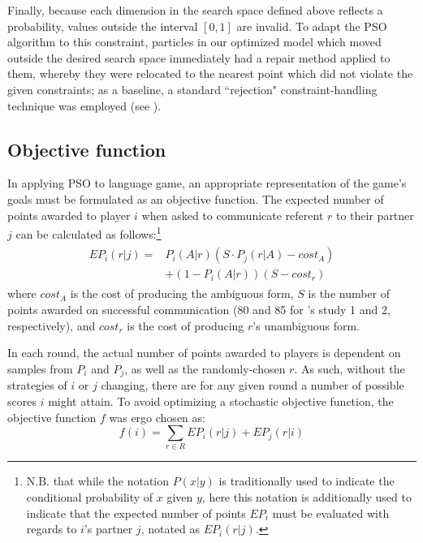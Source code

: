 \documentclass[a4paper,11pt]{article}
\begin{document}
Finally, because each dimension in the search space defined above reflects a probability, values outside the interval $[0, 1]$ are invalid. To adapt the PSO algorithm to this constraint, particles in our optimized model which moved outside the desired search space immediately had a repair method applied to them, whereby they were relocated to the nearest point which did not violate the given constraints; as a baseline, a standard ``rejection" constraint-handling technique was employed (see ).
 
\subsection{Objective function}
\label{sec:objective_func}
In applying PSO to \citeauthor{rohde2012} language game, an appropriate representation of the game's goals must be formulated as an objective function. The expected number of points awarded to player $i$ when asked to communicate referent $r$ to their partner $j$ can be calculated as follows:\footnote{N.B. that while the notation $P(x|y)$ is traditionally used to indicate the conditional probability of $x$ given $y$, here this notation is additionally used to indicate that the expected number of points $EP_i$ must be evaluated with regards to $i$'s partner $j$, notated as $EP_{i}(r|j)$.}
\begin{multline}
\begin{split}
EP_{i}(r|j) = & P_i(A|r)(S \cdot P_j(r|A) - cost_A) \\
              & + (1 - P_i(A|r))(S - cost_r) 
\end{split}
\end{multline}
where $cost_A$ is the cost of producing the ambiguous form, $S$ is the number of points awarded on successful communication (80 and 85 for \citeauthor{rohde2012}'s study 1 and 2, respectively), and $cost_r$ is the cost of producing $r$'s unambiguous form.

In each round, the actual number of points awarded to players is dependent on samples from $P_i$ and $P_j$, as well as the randomly-chosen $r$. As such, without the strategies of $i$ or $j$ changing, there are for any given round a number of possible scores $i$ might attain. To avoid optimizing a stochastic objective function, the objective function $f$ was ergo chosen as:
\begin{equation}
f(i) = \sum_{r \in R} EP_{i}(r|j) + EP_{j}(r|i)
\end{equation}
\end{document}
